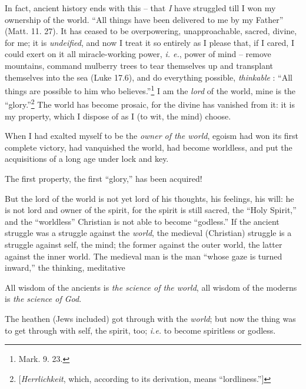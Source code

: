 \documentclass[12pt,a4paper]{book}
\begin{document}
In fact, ancient history ends with this -- that \textit{I} have struggled till 
I won my ownership of the world. ``All things have been delivered to me by my 
Father'' (Matt. 11. 27). It has ceased to be overpowering, unapproachable, 
sacred, divine, for me; it is \textit{undeified}, and now I treat it so 
entirely as I please that, if I cared, I could exert on it all miracle-working 
power, \textit{i. e.}, power of mind -- remove mountains, command mulberry 
trees to tear themselves up and transplant themselves into the sea (Luke 
17.6), and do everything possible, \textit{thinkable} : ``All things are 
possible to him who believes.''\footnote{Mark. 9. 23.} I am the \textit{lord} 
of the world, mine is the ``glory.''\footnote{[\textit{Herrlichkeit}, which, 
according to its derivation, means ``lordliness.'']} The world has become 
prosaic, for the divine has vanished from it: it is my property, which I 
dispose of as I (to wit, the mind) choose.

When I had exalted myself to be the \textit{owner of the world}, egoism had 
won its first complete victory, had vanquished the world, had become 
worldless, and put the acquisitions of a long age under lock and key.

The first property, the first ``glory,'' has been acquired!

But the lord of the world is not yet lord of his thoughts, his feelings, his 
will: he is not lord and owner of the spirit, for the spirit is still sacred, 
the ``Holy Spirit,'' and the ``worldless'' Christian is not able to become 
``godless.'' If the ancient struggle was a struggle against the 
\textit{world}, the medieval (Christian) struggle is a struggle against self, 
the mind; the former against the outer world, the latter against the inner 
world. The medieval man is the man ``whose gaze is turned inward,'' the 
thinking, meditative

All wisdom of the ancients is \textit{the science of the world}, all wisdom of 
the moderns is \textit{the science of God}.

The heathen (Jews included) got through with the \textit{world}; but now the 
thing was to get through with self, the spirit, too; \textit{i.e.} to become 
spiritless or godless.
\end{document}
